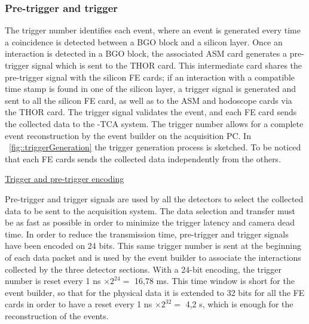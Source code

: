 \subsubsection{Pre-trigger and trigger\newline}

The trigger number identifies each event, where an event is generated every time a coincidence is detected between a BGO block and a silicon layer. Once an interaction is detected in a BGO block, the associated ASM card generates a pre-trigger signal which is sent to the THOR card. This intermediate card shares the pre-trigger signal with the silicon FE cards; if an interaction with a compatible time stamp is found in one of the silicon layer, a trigger signal is generated and sent to all the silicon FE card, as well as to the ASM and hodoscope cards via the THOR card. The trigger signal validates the event, and each FE card sends the collected data to the \charmu-TCA system. The trigger number allows for a complete event reconstruction by the event builder on the acquisition PC. In \figurename~\ref{fig::triggerGeneration} the trigger generation process is sketched.\newline
To be noticed that each FE cards sends the collected data independently from the others.\newline


\underline{Trigger and pre-trigger encoding}\newline

Pre-trigger and trigger signals are used by all the detectors to select the collected data to be sent to the acquisition system. The data selection and transfer must be as fast as possible in order to minimize the trigger latency and camera dead time. In order to reduce the transmission time, pre-trigger and trigger signals have been encoded on 24 bits.\newline
This same trigger number is sent at the beginning of each data packet and is used by the event builder to associate the interactions collected by the three detector sections. With a 24-bit encoding, the trigger number is reset every 1 ns $\times \mathrm{2^{24}} =$ 16,78 ms. This time window is short for the event builder, so that for the physical data it is extended to 32 bits for all the FE cards in order to have a reset every 1 ns $\times \mathrm{2^{32}} =$ 4,2 s, which is enough for the reconstruction of the events.

